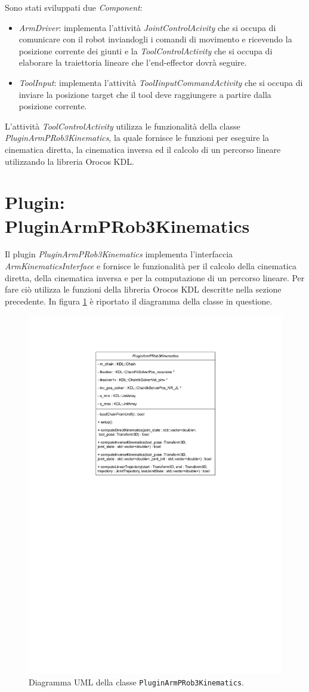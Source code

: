 \noindent
Sono stati sviluppati due \textit{Component}:
\begin{itemize}
	\item \textit{ArmDriver}: implementa l'attività \textit{JointControlAcivity} che si occupa di comunicare con il robot inviandogli i comandi di movimento e ricevendo la posizione corrente dei giunti e la \textit{ToolControlActivity} che si occupa di elaborare la traiettoria lineare che l'end-effector dovrà seguire. 
	\item \textit{ToolInput}: implementa l'attività \textit{ToolIinputCommandActivity} che si occupa di inviare la posizione target che il tool deve raggiungere a partire dalla posizione corrente.
\end{itemize}
\noindent
L'attività \textit{ToolControlActivity} utilizza le funzionalità della classe \textit{PluginArmPRob3Kinematics}, la quale fornisce le funzioni per eseguire la cinematica diretta, la cinematica inversa ed il calcolo di un percorso lineare utilizzando la libreria Orocos KDL.


\section{Plugin: PluginArmPRob3Kinematics}
Il plugin \textit{PluginArmPRob3Kinematics} implementa l'interfaccia \textit{ArmKinematicsInterface} e fornisce le funzionalità per il calcolo della cinematica diretta, della cinematica inversa e per la computazione di un percorso lineare. Per fare ciò utilizza le funzioni della libreria Orocos KDL descritte nella sezione precedente. 
In figura \ref{fig:plugin_uml} è riportato il diagramma della classe in questione.
\begin{figure}[ht!]
	\centering
	\includegraphics[width=0.5\linewidth]{./ImageFiles/PluginArmPRob3Kinematics.drawio.pdf}
	\caption{Diagramma UML della classe \texttt{PluginArmPRob3Kinematics}.}
	\label{fig:plugin_uml}
\end{figure}


